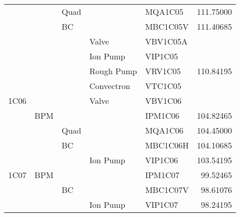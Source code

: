 \begin{table}[hp]
\begin{tabular}{lllllr}
&& Quad && MQA1C05 & 111.75000 \\
&& BC && MBC1C05V & 111.40685 \\
&&& Valve & VBV1C05A & \\
&&& Ion Pump & VIP1C05 & \\
&&& Rough Pump & VRV1C05 & 110.84195 \\
&&& Convectron & VTC1C05 & \\
1C06 &&& Valve & VBV1C06 & \\
& BPM &&& IPM1C06 & 104.82465 \\
&& Quad && MQA1C06 & 104.45000 \\
&& BC && MBC1C06H & 104.10685 \\
&&& Ion Pump & VIP1C06 & 103.54195 \\
1C07 & BPM &&& IPM1C07 & 99.52465 \\
&& BC && MBC1C07V & 98.61076 \\
&&& Ion Pump & VIP1C07 & 98.24195 \\ \hline
\end{tabular}
\end{table}

